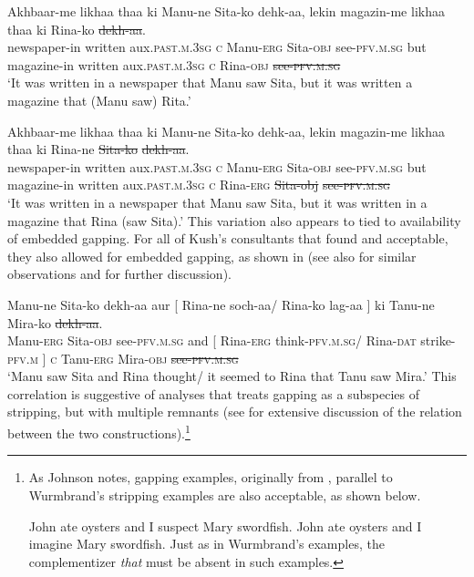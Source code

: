 \documentclass[output=paper]{langscibook}
\begin{document}
\ea \label{maex11}
    \gll Akhbaar-me likhaa thaa ki Manu-ne Sita-ko dehk-aa, lekin magazin-me likhaa thaa ki Rina-ko \sout{dekh-aa}.\\
    newspaper-in written aux.\textsc{past.m.3sg} \textsc{c} Manu-\textsc{erg} Sita-\textsc{obj} see-\textsc{pfv.m.sg} but magazine-in written aux.\textsc{past.m.3sg} \textsc{c} Rina-\textsc{obj} \sout{see-\textsc{pfv.m.sg}}\\
    \glt `It was written in a newspaper that Manu saw Sita, but it was written a magazine that (Manu saw) Rita.'
    
\ex \label{maex12}
    \gll Akhbaar-me likhaa thaa ki Manu-ne Sita-ko dehk-aa, lekin magazin-me likhaa thaa ki Rina-ne \sout{Sita-ko} \sout{dekh-aa}.\\
    newspaper-in written aux.\textsc{past.m.3sg} \textsc{c} Manu-\textsc{erg} Sita-\textsc{obj} see-\textsc{pfv.m.sg} but magazine-in written aux.\textsc{past.m.3sg} \textsc{c} Rina-\textsc{erg} \sout{Sita-obj} \sout{see-\textsc{pfv.m.sg}}\\
    \glt `It was written in a newspaper that Manu saw Sita, but it was written in a magazine that Rina (saw Sita).' \hfill \citep[70 \& 71]{kush16}
\z 
This variation also appears to tied to availability of embedded gapping. For all of Kush's consultants that found  and  acceptable, they also allowed for embedded gapping, as shown in  (see also \citealt{farudi2013} for similar observations and for further discussion).

\ea \label{maex13}
    \gll Manu-ne Sita-ko dekh-aa aur [ Rina-ne soch-aa/ Rina-ko lag-aa ] ki Tanu-ne Mira-ko \sout{dekh-aa}.\\
    Manu-\textsc{erg} Sita-\textsc{obj} see-\textsc{pfv.m.sg} and [ Rina-\textsc{erg} think-\textsc{pfv.m.sg}/ Rina-\textsc{dat} strike-\textsc{pfv.m} ] \textsc{c} Tanu-\textsc{erg} Mira-\textsc{obj} \sout{see-\textsc{pfv.m.sg}}\\
    \glt `Manu saw Sita and Rina thought/ it seemed to Rina that Tanu saw Mira.' \hfill \citep[53]{kush16}
\z 
This correlation is suggestive of analyses that treats gapping as a subspecies of stripping, but with multiple remnants (see \citealt{johnson18} for extensive discussion of the relation between the two constructions).\footnote{As Johnson notes, gapping examples, originally from \citet{weir14}, parallel to Wurmbrand's stripping examples are also acceptable, as shown below.

\ea 
    \ea 
        John ate oysters and I suspect Mary swordfish.
    \ex 
        John ate oysters and I imagine Mary swordfish. \hfill \citep[333]{weir14}
    \z 
\z 
Just as in Wurmbrand's examples, the complementizer \emph{that} must be absent in such examples.}
\end{document}

